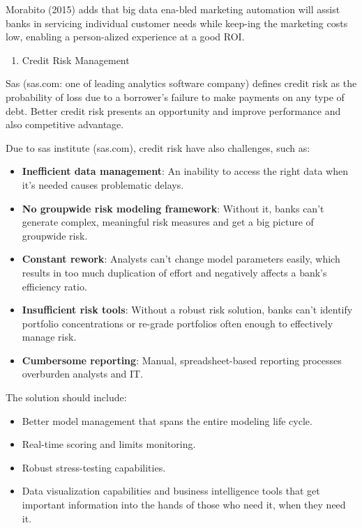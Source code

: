 \documentclass[]{book}
\providecommand{\tightlist}{%
  \setlength{\itemsep}{0pt}\setlength{\parskip}{0pt}}
\begin{document}
Morabito (2015) adds that big data ena-bled marketing automation will
assist banks in servicing individual customer needs while keep-ing the
marketing costs low, enabling a person-alized experience at a good ROI.

\begin{enumerate}
\def\labelenumi{\arabic{enumi}.}
\setcounter{enumi}{2}
\tightlist
\item
  Credit Risk Management
\end{enumerate}

Sas (sas.com: one of leading analytics software company) defines credit
risk as the probability of loss due to a borrower's failure to make
payments on any type of debt. Better credit risk presents an opportunity
and improve performance and also competitive advantage.

Due to sas institute (sas.com), credit risk have also challenges, such
as:

\begin{itemize}
\tightlist
\item
  \textbf{Inefficient data management}: An inability to access the right
  data when it's needed causes problematic delays.
\item
  \textbf{No groupwide risk modeling framework}: Without it, banks can't
  generate complex, meaningful risk measures and get a big picture of
  groupwide risk.
\item
  \textbf{Constant rework}: Analysts can't change model parameters
  easily, which results in too much duplication of effort and negatively
  affects a bank's efficiency ratio.
\item
  \textbf{Insufficient risk tools}: Without a robust risk solution,
  banks can't identify portfolio concentrations or re-grade portfolios
  often enough to effectively manage risk.
\item
  \textbf{Cumbersome reporting}: Manual, spreadsheet-based reporting
  processes overburden analysts and IT.
\end{itemize}

The solution should include:

\begin{itemize}
\tightlist
\item
  Better model management that spans the entire modeling life cycle.
\item
  Real-time scoring and limits monitoring.
\item
  Robust stress-testing capabilities.
\item
  Data visualization capabilities and business intelligence tools that
  get important information into the hands of those who need it, when
  they need it.
\end{itemize}
\end{document}
